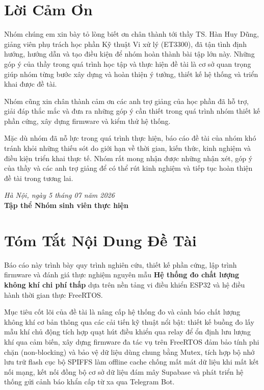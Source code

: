 \documentclass[12pt,a4paper,oneside]{report}
\begin{document}

\chapter*{Lời Cảm Ơn}
Nhóm chúng em xin bày tỏ lòng biết ơn chân thành tới thầy TS. Hàn Huy Dũng, giảng viên phụ trách học phần Kỹ thuật Vi xử lý (ET3300), đã tận tình định hướng, hướng dẫn và tạo điều kiện để nhóm hoàn thành bài tập lớn này. Những góp ý của thầy trong quá trình học tập và thực hiện đề tài là cơ sở quan trọng giúp nhóm từng bước xây dựng và hoàn thiện ý tưởng, thiết kế hệ thống và triển khai được đề tài.

Nhóm cũng xin chân thành cảm ơn các anh trợ giảng của học phần đã hỗ trợ, giải đáp thắc mắc và đưa ra những góp ý cần thiết trong quá trình nhóm thiết kế phần cứng, xây dựng firmware và kiểm thử hệ thống.

Mặc dù nhóm đã nỗ lực trong quá trình thực hiện, báo cáo đề tài của nhóm khó tránh khỏi những thiếu sót do giới hạn về thời gian, kiến thức, kinh nghiệm và điều kiện triển khai thực tế. Nhóm rất mong nhận được những nhận xét, góp ý của thầy và các anh trợ giảng để có thể rút kinh nghiệm và tiếp tục hoàn thiện đề tài trong tương lai.

\vspace{1.5cm}
\begin{flushright}
    \textit{Hà Nội, ngày 5 tháng 07 năm 2026} \\
    \textbf{Tập thể Nhóm sinh viên thực hiện}
\end{flushright}

\chapter*{Tóm Tắt Nội Dung Đề Tài}
Báo cáo này trình bày quy trình nghiên cứu, thiết kế phần cứng, lập trình firmware và đánh giá thực nghiệm nguyên mẫu \textbf{Hệ thống đo chất lượng không khí chi phí thấp} dựa trên nền tảng vi điều khiển ESP32 và hệ điều hành thời gian thực FreeRTOS. 

Mục tiêu cốt lõi của đề tài là nâng cấp hệ thống đo và cảnh báo chất lượng không khí cơ bản thông qua các cải tiến kỹ thuật nổi bật: thiết kế buồng đo lấy mẫu khí chủ động tích hợp quạt hút điều khiển qua relay để ổn định lưu lượng khí qua cảm biến, xây dựng firmware đa tác vụ trên FreeRTOS đảm bảo tính phi chặn (non-blocking) và bảo vệ dữ liệu dùng chung bằng Mutex, tích hợp bộ nhớ lưu trữ flash cục bộ SPIFFS làm offline cache chống mất mát dữ liệu khi mất kết nối mạng, kết nối đồng bộ cơ sở dữ liệu đám mây Supabase và phát triển hệ thống gửi cảnh báo khẩn cấp từ xa qua Telegram Bot.
\end{document}
